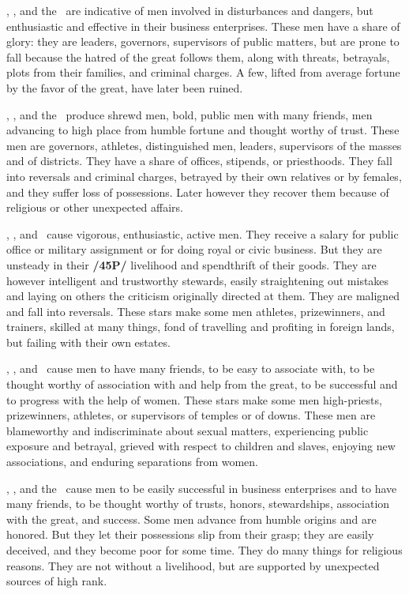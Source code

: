 \Jupiter, \Mars, and the \Sun\, are indicative of men involved in disturbances and dangers, but enthusiastic
and effective in their business enterprises. These men have a share of glory: they are leaders, governors, supervisors of public matters, but are prone to fall because the hatred of the great follows them, along with threats, betrayals, plots from their families, and criminal charges. A few, lifted from average fortune by the favor of the great, have later been ruined.

\Jupiter, \Mars, and the \Moon\, produce shrewd men, bold, public men with many friends, men advancing to high place from humble fortune and thought worthy of trust. These men are governors, athletes, distinguished men, leaders, supervisors of the masses and of districts. They have a share of offices, stipends, or priesthoods. They fall into reversals and criminal charges, betrayed by their own relatives or by females, and they suffer loss of possessions. Later however they recover them because of religious or other unexpected affairs.

\Jupiter, \Mars, and \Mercury\, cause vigorous, enthusiastic, active men. They receive a salary for public
office or military assignment or for doing royal or civic business. But they are unsteady in their \textbf{/45P/}
livelihood and spendthrift of their goods. They are however intelligent and trustworthy stewards, easily straightening out mistakes and laying on others the criticism originally directed at them. They are maligned and fall into reversals. These stars make some men athletes, prizewinners, and trainers, skilled at many things, fond of travelling and profiting in foreign lands, but failing with their own estates. 

\Jupiter, \Mars, and \Venus\, cause men to have many friends, to be easy to associate with, to be thought worthy of association with and help from the great, to be successful and to progress with the help of women. These stars make some men high-priests, prizewinners, athletes, or supervisors of temples or of downs. These men are blameworthy and indiscriminate about sexual matters, experiencing public exposure and betrayal, grieved with respect to children and slaves, enjoying new associations, and enduring separations from women.

\Jupiter, \Mercury, and the \Sun\, cause men to be easily successful in business enterprises and to have many friends, to be thought worthy of trusts, honors, stewardships, association with the great, and success. Some men advance from humble origins and are honored. But they let their possessions slip from their grasp; they are easily deceived, and they become poor for some time. They do many things for religious
reasons. They are not without a livelihood, but are supported by unexpected sources of high rank.

